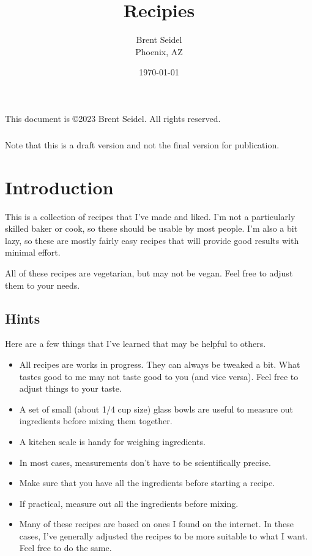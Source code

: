 \documentclass[10pt, openany]{book}
\title{Recipies}
\author{Brent Seidel \\ Phoenix, AZ}
\date{ \today }
\begin{document}
%
%
\frontmatter
\maketitle
\begin{center}
This document is \copyright 2023 Brent Seidel.  All rights reserved.

\paragraph{}Note that this is a draft version and not the final version for publication.
\end{center}
\tableofcontents

\mainmatter

\chapter{Introduction}
This is a collection of recipes that I've made and liked.  I'm not a particularly skilled baker or cook, so these should be usable by most people.  I'm also a bit lazy, so these are mostly fairly easy recipes that will provide good results with minimal effort.

All of these recipes are vegetarian, but may not be vegan.  Feel free to adjust them to your needs.

\section{Hints}
Here are a few things that I've learned that may be helpful to others.
\begin{itemize}
  \item All recipes are works in progress.  They can always be tweaked a bit.  What tastes good to me may not taste good to you (and vice versa).  Feel free to adjust things to your taste.
  \item A set of small (about 1/4 cup size) glass bowls are useful to measure out ingredients before mixing them together.
  \item A kitchen scale is handy for weighing ingredients.
  \item In most cases, measurements don't have to be scientifically precise.
  \item Make sure that you have all the ingredients before starting a recipe.
  \item If practical, measure out all the ingredients before mixing.
  \item Many of these recipes are based on ones I found on the internet.  In these cases, I've generally adjusted the recipes to be more suitable to what I want.  Feel free to do the same.
\end{itemize}
\end{document}

